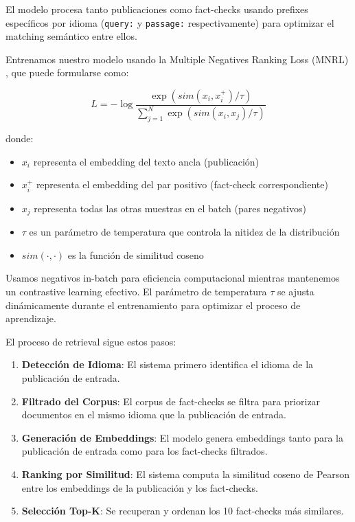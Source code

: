 \documentclass[11pt]{article}
\begin{document}
El modelo procesa tanto publicaciones como fact-checks usando prefixes específicos por idioma (\texttt{query:} y \texttt{passage:} respectivamente) para optimizar el matching semántico entre ellos.

Entrenamos nuestro modelo usando la Multiple Negatives Ranking Loss (MNRL) \cite{jadwin2023improving}, que puede formularse como:

\begin{equation}
L = -\log \frac{\exp(sim(x_i, x_i^+)/\tau)}{\sum_{j=1}^{N} \exp(sim(x_i, x_j)/\tau)}
\end{equation}

donde:
\begin{itemize}
    \item $x_i$ representa el embedding del texto ancla (publicación)
    \item $x_i^+$ representa el embedding del par positivo (fact-check correspondiente)
    \item $x_j$ representa todas las otras muestras en el batch (pares negativos)
    \item $\tau$ es un parámetro de temperatura que controla la nitidez de la distribución
    \item $sim(\cdot,\cdot)$ es la función de similitud coseno
\end{itemize}

Usamos negativos in-batch para eficiencia computacional mientras mantenemos un contrastive learning efectivo. El parámetro de temperatura $\tau$ se ajusta dinámicamente durante el entrenamiento para optimizar el proceso de aprendizaje.

El proceso de retrieval sigue estos pasos:
\begin{enumerate}
    \item \textbf{Detección de Idioma}: El sistema primero identifica el idioma de la publicación de entrada.
    \item \textbf{Filtrado del Corpus}: El corpus de fact-checks se filtra para priorizar documentos en el mismo idioma que la publicación de entrada.
    \item \textbf{Generación de Embeddings}: El modelo genera embeddings tanto para la publicación de entrada como para los fact-checks filtrados.
    \item \textbf{Ranking por Similitud}: El sistema computa la similitud coseno de Pearson entre los embeddings de la publicación y los fact-checks.
    \item \textbf{Selección Top-K}: Se recuperan y ordenan los 10 fact-checks más similares.
\end{enumerate}
\end{document}
